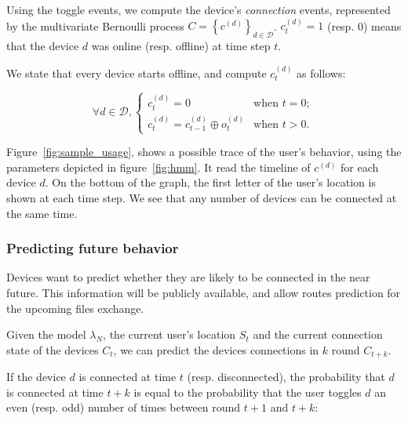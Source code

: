 Using the toggle events, we compute the device's \emph{connection} events, represented by the multivariate Bernoulli process $C=\left\{ c^{(d)} \right\}_{d\in\mathcal{D}}$. 
$c^{(d)}_t=1$ (resp. 0) means that the device $d$ was online (resp. offline) at time step $t$.

We state that every device starts offline, and compute $c^{(d)}_t$ as follows:

$$ \forall d \in \mathcal{D},
\begin{cases}
c^{(d)}_t=0 &\text{when } t=0; \\
c^{(d)}_t=c^{(d)}_{t-1} \oplus o^{(d)}_t &\text{when } t>0.
\end{cases}$$

Figure~\ref{fig:sample_usage}, shows a possible trace of the user's behavior, using the parameters depicted in figure~\ref{fig:hmm}. It read the timeline of $c^{(d)}$ for each device $d$. On the bottom of the graph, the first letter of the user's location is shown at each time step. We see that any number of devices can be connected at the same time.




\subsubsection{Predicting future behavior} %
\label{ssub:predicting_future_behavior}
Devices want to predict whether they are likely to be connected in the near future.
This information will be publicly available, and allow routes prediction for the upcoming files exchange.

Given the model $\lambda_N$, the current user's location $S_t$ and the current connection state of the devices $C_t$, we can predict the devices connections in $k$ round $C_{t+k}$.

If the device $d$ is connected at time $t$ (resp. disconnected), the probability that $d$ is connected at time $t+k$ is equal to the probability that the user toggles $d$ an even (resp. odd) number of times between round $t+1$ and $t+k$:

